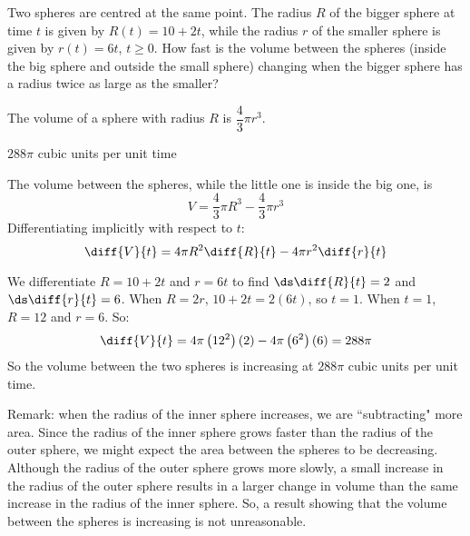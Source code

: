 \begin{question}
Two spheres are centred at the same point. The radius $R$ of the bigger sphere at time $t$ is given by $R(t)=10+2t$, while the radius $r$ of the smaller sphere is given by $r(t)=6t$, $t \ge 0$. How fast is the volume between the spheres (inside the big sphere and outside the small sphere) changing when the bigger sphere has a radius twice as large as the smaller?
\end{question}
\begin{hint}
The volume of a sphere with radius $R$ is $\dfrac{4}{3}\pi r^3$.
\end{hint}
\begin{answer}
$288 \pi$ cubic units per unit time
\end{answer}
\begin{solution}
The volume between the spheres, while the little one is inside the big one, is
\[V=\frac{4}{3}\pi R^3 - \frac{4}{3}\pi r^3\]
Differentiating implicitly with respect to $t$:
\[\diff{V}{t}=4\pi R^2\diff{R}{t}-4\pi r^2\diff{r}{t}\]

We differentiate $R=10+2t$ and $r=6t$ to find $\ds\diff{R}{t}=2$ and $\ds\diff{r}{t}=6$. When $R=2r$, $10+2t=2(6t)$, so $t=1$. When $t=1$, $R=12$ and $r=6$. So:
\[\diff{V}{t}=4\pi\left(12^2\right)(2)-4\pi\left(6^2\right)(6)=288\pi\]
So the volume between the two spheres is increasing at $288\pi$ cubic units per unit time.

Remark: when the radius of the inner sphere increases, we are ``subtracting" more area. Since the radius of the inner sphere grows faster than the radius of the outer sphere, we might expect the area between the spheres to be decreasing. Although the radius of the outer sphere grows more slowly, a small increase in the radius of the outer sphere results in a larger change in volume than the same increase in the radius of the inner sphere. So, a result showing that the volume between the spheres is increasing is not unreasonable.
\end{solution}



